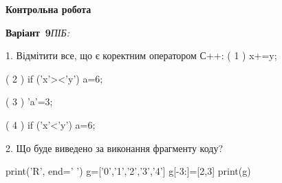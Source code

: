 \documentclass[11pt]{article}
\begin{document}
{\large\textbf{Контрольна робота}}

\textbf{Варіант \No\,9}\hfill \textit{ПІБ:}\,\underline{\hspace{60mm}}
\vspace{4mm}

1. %
Відмітити все, що є коректним оператором С++:
( 1 ) x+=y;

( 2 ) if ('x'><'y') a=6;

( 3 ) 'a'=3;

( 4 ) if ('x'<'y') a=6;


2. Що буде виведено за виконання фрагменту коду?

print('R', end=' ')
g=['0','1','2','3','4']
g[-3:]=[2,3]
print(g)



\newpage
\end{document}

